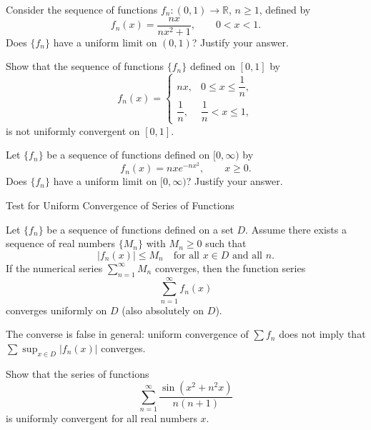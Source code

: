 \documentclass[12pt, a4paper]{article}
\begin{document}
\clearpage

\begin{problem}
Consider the sequence of functions $f_n:(0,1)\to\mathbb{R}$, $n\ge 1$, defined by
\[
f_n(x)=\frac{nx}{nx^2+1}, \qquad 0<x<1.
\]
Does $\{f_n\}$ have a uniform limit on $(0,1)$? Justify your answer.
\end{problem}

\clearpage

\begin{problem}
Show that the sequence of functions $\{f_n\}$ defined on $[0,1]$ by
\[
f_n(x)=
\begin{cases}
nx, & 0\le x \le \dfrac{1}{n},\\[6pt]
\dfrac{1}{n}, & \dfrac{1}{n} < x \le 1,
\end{cases}
\]
is not uniformly convergent on $[0,1]$.
\end{problem}

\clearpage

\begin{problem}
Let $\{f_n\}$ be a sequence of functions defined on $[0,\infty)$ by
\[
f_n(x)=nxe^{-nx^2}, \qquad x\ge 0.
\]
Does $\{f_n\}$ have a uniform limit on $[0,\infty)$? Justify your answer.
\end{problem}

\clearpage

\begin{heading}
    Test for Uniform Convergence of Series of Functions
\end{heading}

\vspace{10pt}

\begin{theorem}
Let $\{f_n\}$ be a sequence of functions defined on a set $D$.
Assume there exists a sequence of real numbers $\{M_n\}$ with $M_n\ge 0$ such that
\[
|f_n(x)|\le M_n \quad \text{for all } x\in D \text{ and all } n.
\]
If the numerical series $\sum_{n=1}^{\infty} M_n$ converges, then the function series
\[
\sum_{n=1}^{\infty} f_n(x)
\]
converges uniformly on $D$ (also absolutely on $D$).
\end{theorem}

\begin{problem}[Remark]
The converse is false in general: uniform convergence of $\sum f_n$ does not imply
that $\sum \sup_{x\in D}|f_n(x)|$ converges.
\end{problem}

\clearpage

\begin{problem}
Show that the series of functions
\[
\sum_{n=1}^{\infty} \frac{\sin\!\left(x^{2}+n^{2}x\right)}{n(n+1)}
\]
is uniformly convergent for all real numbers $x$.
\end{problem}

\clearpage


\EndPage
\end{document}

